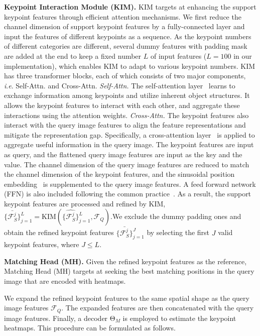 \documentclass[runningheads]{llncs}
\newcommand{\ie}{\textit{i}.\textit{e}. }
\begin{document}
\textbf{Keypoint Interaction Module (KIM).}
KIM targets at enhancing the support keypoint features through efficient attention mechanisms. We first reduce the channel dimension of support keypoint features by a fully-connected layer and input the features of different keypoints as a sequence. As the keypoint numbers of different categories are different, several dummy features with padding mask are added at the end to keep a fixed number $L$ of input features ($L=100$ in our implementation), which enables KIM to adapt to various keypoint numbers. 
KIM has three transformer blocks, each of which consists of two major components, \ie Self-Attn. and Cross-Attn. \emph{Self-Attn.} The self-attention layer~\cite{vaswani2017attention} learns to exchange information among keypoints and utilize inherent object structures. It allows the keypoint features to interact with each other, and aggregate these interactions using the attention weights. \emph{Cross-Attn.} The keypoint features also interact with the query image features to align the feature representations and mitigate the representation gap. Specifically, a cross-attention layer~\cite{carion2020end} is applied to aggregate useful information in the query image. The keypoint features are input as query, and the flattened query image features are input as the key and the value. The channel dimension of the query image features are reduced to match the channel dimension of the keypoint features, and the sinusoidal position embedding~\cite{parmar2018image,vaswani2017attention} is supplemented to the query image features. A feed forward network (FFN) is also included following the common practice~\cite{vaswani2017attention}. As a result, the support keypoint features are processed and refined by KIM, $\{\bar{\mathcal{F}_{S}^{j}}\}_{j=1}^{L} = \text{KIM}(\{\hat{\mathcal{F}_{S}^{j}}\}_{j=1}^{L}, \mathcal{F}_{Q})$.We exclude the dummy padding ones and obtain the refined keypoint features $\{\bar{\mathcal{F}_{S}^{j}}\}_{j=1}^{J}$ by selecting the first $J$ valid keypoint features, where $J \leq L$. 


\textbf{Matching Head (MH).} Given the refined keypoint features as the reference, Matching Head (MH) targets at seeking the best matching positions in the query image that are encoded with heatmaps.

We expand the refined keypoint features to the same spatial shape as the query image features $\mathcal{F}_{Q}$. The expanded features are then concatenated with the query image features. Finally, a decoder $\mathrm{\Theta}_{M}$ is employed to estimate the keypoint heatmaps. This procedure can be formulated as follows.
\end{document}
